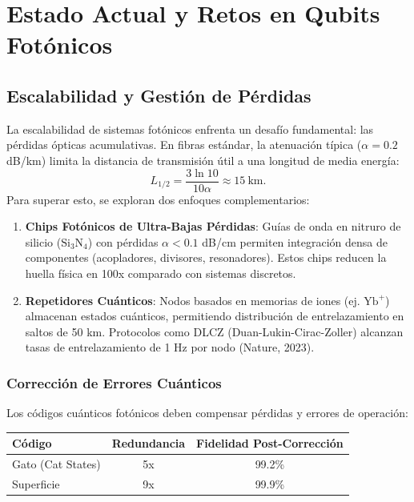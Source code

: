 \documentclass{article}
\begin{document}
\section{Estado Actual y Retos en Qubits Fotónicos}

\subsection*{Escalabilidad y Gestión de Pérdidas}

La escalabilidad de sistemas fotónicos enfrenta un desafío fundamental: las pérdidas ópticas acumulativas. En fibras estándar, la atenuación típica ($\alpha = 0.2$ dB/km) limita la distancia de transmisión útil a una longitud de media energía:
\[
L_{1/2} = \frac{3 \ln 10}{10 \alpha} \approx 15\ \text{km}.
\]
Para superar esto, se exploran dos enfoques complementarios:

\begin{enumerate}
    \item \textbf{Chips Fotónicos de Ultra-Bajas Pérdidas}: Guías de onda en nitruro de silicio ($\text{Si}_3\text{N}_4$) con pérdidas $\alpha < 0.1$ dB/cm permiten integración densa de componentes (acopladores, divisores, resonadores). Estos chips reducen la huella física en 100x comparado con sistemas discretos.
    
    \item \textbf{Repetidores Cuánticos}: Nodos basados en memorias de iones (ej. $\text{Yb}^+$) almacenan estados cuánticos, permitiendo distribución de entrelazamiento en saltos de 50 km. Protocolos como DLCZ (Duan-Lukin-Cirac-Zoller) alcanzan tasas de entrelazamiento de 1 Hz por nodo (Nature, 2023).
\end{enumerate}

\subsubsection*{Corrección de Errores Cuánticos}

Los códigos cuánticos fotónicos deben compensar pérdidas y errores de operación:

\begin{table}[h]
\centering
\small
\begin{tabular}{|l|c|c|}
\hline
\textbf{Código} & \textbf{Redundancia} & \textbf{Fidelidad Post-Corrección} \\
\hline
Gato (Cat States) & 5x & 99.2\% \\
Superficie & 9x & 99.9\% \\
\hline
\end{tabular}
\end{table}
\end{document}
